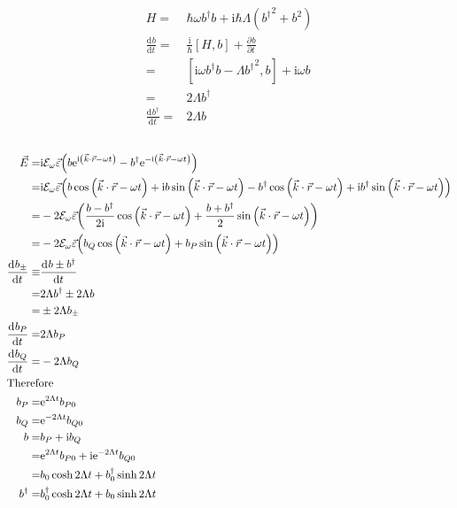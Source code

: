 \documentclass[10pt,fleqn]{article}
\newcommand{\ud}{\mathrm{d}}
\newcommand{\ue}{\mathrm{e}}
\newcommand{\ui}{\mathrm{i}}
\newcommand{\eqar}[1]
{
  \begin{align*}
    #1
  \end{align*}
}
\newcommand{\paren}[1]{{\left({#1}\right)}}
\newcommand{\sqr}[1]{{\left[{#1}\right]}}
\newcommand{\pdiff}[3][{}]{{\frac{\partial^{#1} {#2}}{\partial {#3}{}^{#1}}}}
\newcommand{\diff}[3][{}]{{\frac{\ud^{#1} {#2}}{\ud {#3}{}^{#1}}}}
\begin{document}
\section{}
\subsection{}
\eqar{
  H=&\hbar\omega b^\dagger b+\ui\hbar\Lambda\paren{{b^\dagger}^2+b^2}\\
  \diff{b}{t}=&\frac{\ui}{\hbar}\sqr{H, b}+\pdiff{b}{t}\\
  =&\sqr{\ui\omega b^\dagger b-\Lambda{b^\dagger}^2, b}+\ui\omega b\\
  =&2\Lambda b^\dagger\\
  \diff{b^\dagger}{t}=&2\Lambda b
}
\subsection{}
\eqar{
  \vec E=&\ui\mathcal{E}_\omega\vec\varepsilon\paren{b\ue^{\ui\paren{\vec k\cdot\vec r-\omega t}}-b^\dagger\ue^{-\ui\paren{\vec k\cdot\vec r-\omega t}}}\\
  =&\ui\mathcal{E}_\omega\vec\varepsilon\paren{b\cos\paren{\vec k\cdot\vec r-\omega t}+\ui b\sin\paren{\vec k\cdot\vec r-\omega t}-b^\dagger\cos\paren{\vec k\cdot\vec r-\omega t}+\ui b^\dagger\sin\paren{\vec k\cdot\vec r-\omega t}}\\
  =&-2\mathcal{E}_\omega\vec\varepsilon\paren{\frac{b-b^\dagger}{2\ui}\cos\paren{\vec k\cdot\vec r-\omega t}+\frac{b+b^\dagger}{2}\sin\paren{\vec k\cdot\vec r-\omega t}}\\
  =&-2\mathcal{E}_\omega\vec\varepsilon\paren{b_Q\cos\paren{\vec k\cdot\vec r-\omega t}+b_P\sin\paren{\vec k\cdot\vec r-\omega t}}\\
  \diff{b_{\pm}}{t}\equiv&\diff{b\pm b^\dagger}{t}\\
  =&2\Lambda b^\dagger\pm2\Lambda b\\
  =&\pm2\Lambda b_\pm\\
  \diff{b_P}{t}=&2\Lambda b_P\\
  \diff{b_Q}{t}=&-2\Lambda b_Q\\
  \intertext{Therefore}
  b_P=&\ue^{2\Lambda t}b_{P0}\\
  b_Q=&\ue^{-2\Lambda t}b_{Q0}\\
  b=&b_P+\ui b_Q\\
  =&\ue^{2\Lambda t}b_{P0}+\ui\ue^{-2\Lambda t}b_{Q0}\\
  =&b_0\cosh2\Lambda t+b_0^\dagger\sinh2\Lambda t\\
  b^\dagger=&b_0^\dagger\cosh2\Lambda t+b_0\sinh2\Lambda t
}
\end{document}
